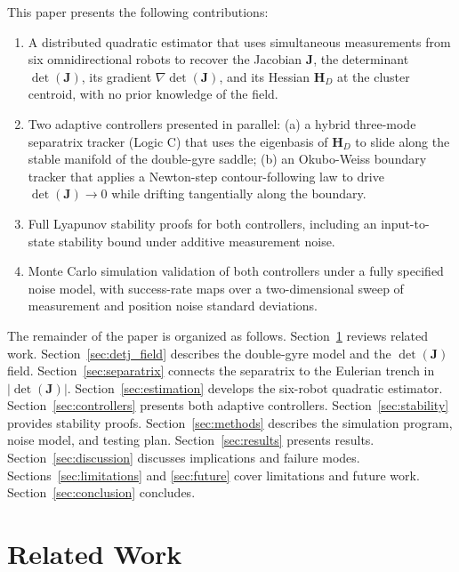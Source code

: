 \documentclass[lettersize,journal]{IEEEtran}
\begin{document}
This paper presents the following contributions:
\begin{enumerate}
    \item A distributed quadratic estimator that uses simultaneous measurements
          from six omnidirectional robots to recover the Jacobian $\mathbf{J}$,
          the determinant $\det(\mathbf{J})$, its gradient
          $\nabla\det(\mathbf{J})$, and its Hessian $\mathbf{H}_D$ at the cluster
          centroid, with no prior knowledge of the field.
    \item Two adaptive controllers presented in parallel: (a) a hybrid three-mode
          separatrix tracker (Logic C) that uses the eigenbasis of
          $\mathbf{H}_D$ to slide along the stable manifold of the double-gyre
          saddle; (b) an Okubo-Weiss boundary tracker that applies a Newton-step
          contour-following law to drive $\det(\mathbf{J}) \to 0$ while drifting
          tangentially along the boundary.
    \item Full Lyapunov stability proofs for both controllers, including an
          input-to-state stability bound under additive measurement noise.
    \item Monte Carlo simulation validation of both controllers under a fully
          specified noise model, with success-rate maps over a two-dimensional
          sweep of measurement and position noise standard deviations.
\end{enumerate}

The remainder of the paper is organized as follows. Section~\ref{sec:related}
reviews related work. Section~\ref{sec:detj_field} describes the double-gyre
model and the $\det(\mathbf{J})$ field. Section~\ref{sec:separatrix} connects the
separatrix to the Eulerian trench in $|\det(\mathbf{J})|$.
Section~\ref{sec:estimation} develops the six-robot quadratic estimator.
Section~\ref{sec:controllers} presents both adaptive controllers.
Section~\ref{sec:stability} provides stability proofs.
Section~\ref{sec:methods} describes the simulation program, noise model, and
testing plan. Section~\ref{sec:results} presents results.
Section~\ref{sec:discussion} discusses implications and failure modes.
Sections~\ref{sec:limitations} and \ref{sec:future} cover limitations and
future work. Section~\ref{sec:conclusion} concludes.


\section{Related Work}
\label{sec:related}
\end{document}
